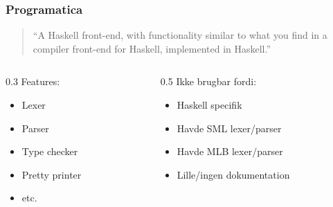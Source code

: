 \documentclass[slidestop,compress,mathserif, xcolor=dvipsnames]{beamer}
\begin{document}
\begin{frame}[c]
  \frametitle{Programatica}  

  \begin{quote}
    "`A Haskell front-end, with functionality similar to what you find in a
    compiler front-end for Haskell, implemented in Haskell."'
    \\ \raggedleft \cite{programatica-features}
  \end{quote}

  \begin{columns}    
    \begin{column}{0.3\textwidth{}}
      Features:
      \begin{itemize}
      \item Lexer
      \item Parser
      \item Type checker
      \item Pretty printer
      \item etc.
      \end{itemize}
    \end{column}
    \begin{column}{0.5\textwidth{}}
      Ikke brugbar fordi:
      \begin{itemize}
      \item Haskell specifik
      \item Havde SML lexer/parser 
      \item Havde MLB lexer/parser
      \item Lille/ingen dokumentation
      \end{itemize}
    \end{column}
  \end{columns}
\end{frame}
\end{document}
